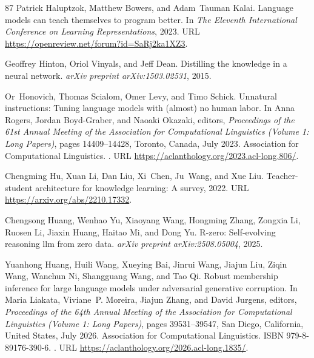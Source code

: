 \begin{thebibliography}{87}
Patrick Haluptzok, Matthew Bowers, and Adam~Tauman Kalai.
\newblock Language models can teach themselves to program better.
\newblock In \emph{The Eleventh International Conference on Learning Representations}, 2023.
\newblock URL \url{https://openreview.net/forum?id=SaRj2ka1XZ3}.

Geoffrey Hinton, Oriol Vinyals, and Jeff Dean.
\newblock Distilling the knowledge in a neural network.
\newblock \emph{arXiv preprint arXiv:1503.02531}, 2015.

Or~Honovich, Thomas Scialom, Omer Levy, and Timo Schick.
\newblock Unnatural instructions: Tuning language models with (almost) no human labor.
\newblock In Anna Rogers, Jordan Boyd-Graber, and Naoaki Okazaki, editors, \emph{Proceedings of the 61st Annual Meeting of the Association for Computational Linguistics (Volume 1: Long Papers)}, pages 14409--14428, Toronto, Canada, July 2023. Association for Computational Linguistics.
\newblock {}.
\newblock URL \url{https://aclanthology.org/2023.acl-long.806/}.

Chengming Hu, Xuan Li, Dan Liu, Xi~Chen, Ju~Wang, and Xue Liu.
\newblock Teacher-student architecture for knowledge learning: A survey, 2022.
\newblock URL \url{https://arxiv.org/abs/2210.17332}.

Chengsong Huang, Wenhao Yu, Xiaoyang Wang, Hongming Zhang, Zongxia Li, Ruosen Li, Jiaxin Huang, Haitao Mi, and Dong Yu.
\newblock R-zero: Self-evolving reasoning llm from zero data.
\newblock \emph{arXiv preprint arXiv:2508.05004}, 2025.

Yuanhong Huang, Huili Wang, Xueying Bai, Jinrui Wang, Jiajun Liu, Ziqin Wang, Wanchun Ni, Shangguang Wang, and Tao Qi.
\newblock Robust membership inference for large language models under adversarial generative corruption.
\newblock In Maria Liakata, Viviane~P. Moreira, Jiajun Zhang, and David Jurgens, editors, \emph{Proceedings of the 64th Annual Meeting of the {A}ssociation for {C}omputational {L}inguistics (Volume 1: Long Papers)}, pages 39531--39547, San Diego, California, United States, July 2026. Association for Computational Linguistics.
\newblock ISBN 979-8-89176-390-6.
\newblock {}.
\newblock URL \url{https://aclanthology.org/2026.acl-long.1835/}.


\end{thebibliography}
